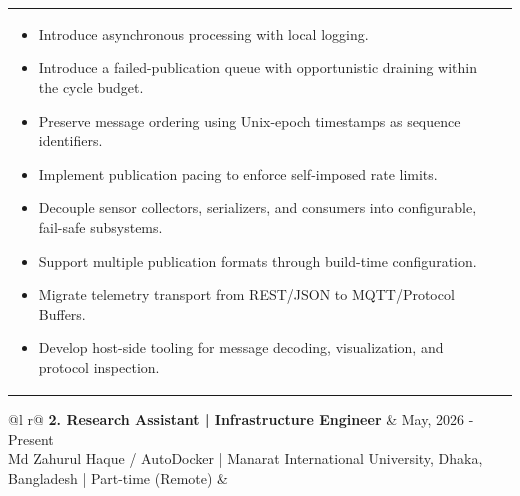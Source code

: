 \begin{tabularx}{\linewidth}{ @{}l r@{} }
{\begin{minipage}[t]{\linewidth}
\begin{itemize}[nosep,after=\strut, leftmargin=1em, itemsep=3pt]
\begin{itemize}[nosep,after=\strut, leftmargin=1.5em, itemsep=1pt]
				\item[--] Introduce asynchronous processing with local logging.
				\item[--] Introduce a failed-publication queue with opportunistic draining within the cycle budget.
				\item[--] Preserve message ordering using Unix-epoch timestamps as sequence identifiers.
				\item[--] Implement publication pacing to enforce self-imposed rate limits.
				\item[--] Decouple sensor collectors, serializers, and consumers into configurable, fail-safe subsystems.
				\item[--] Support multiple publication formats through build-time configuration.
				\item[--] Migrate telemetry transport from REST/JSON to MQTT/Protocol Buffers.
			    \item[--] Develop host-side tooling for message decoding, visualization, and protocol inspection.
			\end{itemize}

    \end{itemize}
    \end{minipage}
}  \\
\end{tabularx}


\begin{tabularx}{\linewidth}{ @{}l r@{} }
\textbf{2. Research Assistant | Infrastructure Engineer}
& \hfill
May, 2026 - Present \\[3.75pt]
Md Zahurul Haque / AutoDocker | Manarat International University, Dhaka, Bangladesh | Part-time (Remote)
& \hfill \\[3.75pt]
  \\
\end{tabularx}
